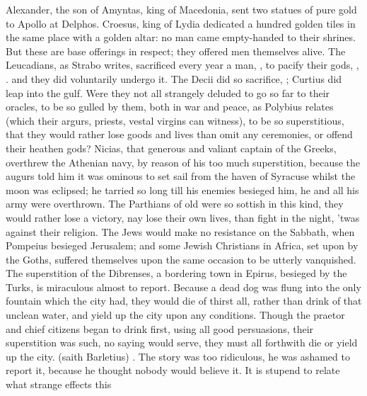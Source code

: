 {Alexander, the son of Amyntas, king of Macedonia, sent two
statues of pure gold to Apollo at Delphos. Croesus, king of Lydia
dedicated a hundred golden tiles in the same place with a golden altar:
no man came empty-handed to their shrines. But these are base offerings
in respect; they offered men themselves alive. The Leucadians, as
Strabo writes, sacrificed every year a man, , to pacify their gods, , \etc{}. and
they did voluntarily undergo it. The Decii did so sacrifice, ; Curtius did leap into the gulf. Were they not all strangely
deluded to go so far to their oracles, to be so gulled by them, both in
war and peace, as Polybius relates (which their argurs, priests, vestal
virgins can witness), to be so superstitious, that they would rather
lose goods and lives than omit any ceremonies, or offend their heathen
gods? Nicias, that generous and valiant captain of the Greeks,
overthrew the Athenian navy, by reason of his too much superstition,
 because the augurs told him it was ominous to set sail from the
haven of Syracuse whilst the moon was eclipsed; he tarried so long till
his enemies besieged him, he and all his army were overthrown. The
Parthians of old were so sottish in this kind, they would rather
lose a victory, nay lose their own lives, than fight in the night,
'twas against their religion. The Jews would make no resistance on the
Sabbath, when Pompeius besieged Jerusalem; and some Jewish Christians
in Africa, set upon by the Goths, suffered themselves upon the same
occasion to be utterly vanquished. The superstition of the Dibrenses, a
bordering town in Epirus, besieged by the Turks, is miraculous almost
to report. Because a dead dog was flung into the only fountain which
the city had, they would die of thirst all, rather than drink of that
unclean water, and yield up the city upon any conditions. Though
the praetor and chief citizens began to drink first, using all good
persuasions, their superstition was such, no saying would serve, they
must all forthwith die or yield up the city. 
(saith Barletius) . The story was too
ridiculous, he was ashamed to report it, because he thought nobody
would believe it. It is stupend to relate what strange effects this
}
